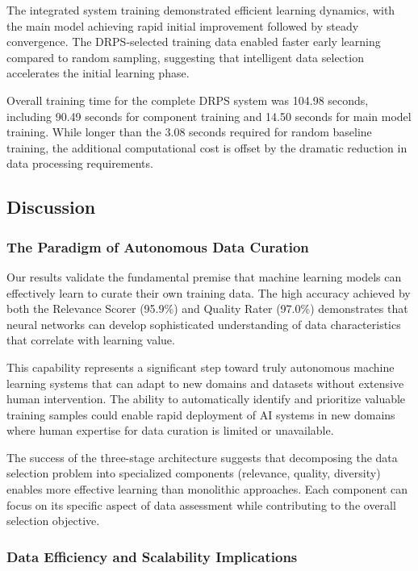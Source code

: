\documentclass[12pt]{article}
\begin{document}
The integrated system training demonstrated efficient learning dynamics, with the main model achieving rapid initial improvement followed by steady convergence. The DRPS-selected training data enabled faster early learning compared to random sampling, suggesting that intelligent data selection accelerates the initial learning phase.

Overall training time for the complete DRPS system was 104.98 seconds, including 90.49 seconds for component training and 14.50 seconds for main model training. While longer than the 3.08 seconds required for random baseline training, the additional computational cost is offset by the dramatic reduction in data processing requirements.

\subsection{Discussion}\label{discussion}

\subsubsection{The Paradigm of Autonomous Data Curation}\label{autonomous-curation}

Our results validate the fundamental premise that machine learning models can effectively learn to curate their own training data. The high accuracy achieved by both the Relevance Scorer (95.9\%) and Quality Rater (97.0\%) demonstrates that neural networks can develop sophisticated understanding of data characteristics that correlate with learning value.

This capability represents a significant step toward truly autonomous machine learning systems that can adapt to new domains and datasets without extensive human intervention. The ability to automatically identify and prioritize valuable training samples could enable rapid deployment of AI systems in new domains where human expertise for data curation is limited or unavailable.

The success of the three-stage architecture suggests that decomposing the data selection problem into specialized components (relevance, quality, diversity) enables more effective learning than monolithic approaches. Each component can focus on its specific aspect of data assessment while contributing to the overall selection objective.

\subsubsection{Data Efficiency and Scalability Implications}\label{efficiency-implications}
\end{document}
